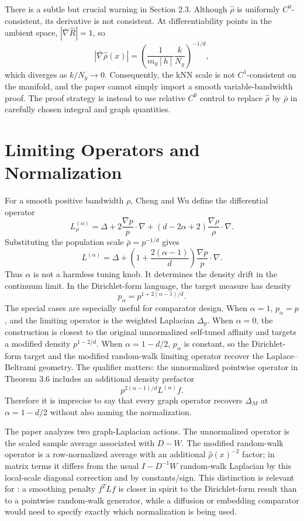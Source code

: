 \documentclass[11pt]{article}
\begin{document}
There is a subtle but crucial warning in Section 2.3. Although
\(\widehat\rho\) is uniformly \(C^0\)-consistent, its derivative is not
consistent. At differentiability points in the ambient space,
\(|\bar\nabla \widehat R|=1\), so
\[
  |\bar\nabla \widehat\rho(x)|
  =
  \left(\frac{1}{m_0[h]}\frac{k}{N_y}\right)^{-1/d},
\]
which diverges as \(k/N_y\to 0\). Consequently, the kNN scale is not
\(C^1\)-consistent on the manifold, and the paper cannot simply import a
smooth variable-bandwidth proof. The proof strategy is instead to use relative
\(C^0\) control to replace \(\widehat\rho\) by \(\bar\rho\) in carefully chosen
integral and graph quantities.

\section{Limiting Operators and Normalization}

For a smooth positive bandwidth \(\rho\), Cheng and Wu define the differential
operator
\[
  L_\rho^{(\alpha)}
  =
  \Delta
  +2\frac{\nabla p}{p}\cdot\nabla
  +(d-2\alpha+2)\frac{\nabla\rho}{\rho}\cdot\nabla .
\]
Substituting the population scale \(\bar\rho=p^{-1/d}\) gives
\[
  L^{(\alpha)}
  =
  \Delta
  +
  \left(1+\frac{2(\alpha-1)}{d}\right)
  \frac{\nabla p}{p}\cdot\nabla .
\]
Thus \(\alpha\) is not a harmless tuning knob. It determines the density drift
in the continuum limit. In the Dirichlet-form language, the target measure has
density
\[
  p_\alpha=p^{1+2(\alpha-1)/d}.
\]
The special cases are especially useful for comparator design. When
\(\alpha=1\), \(p_\alpha=p\), and the limiting operator is the weighted
Laplacian \(\Delta_p\). When \(\alpha=0\), the construction is closest to the
original unnormalized self-tuned affinity and targets a modified density
\(p^{1-2/d}\). When \(\alpha=1-d/2\), \(p_\alpha\) is constant, so the
Dirichlet-form target and the modified random-walk limiting operator recover
the Laplace--Beltrami geometry. The qualifier matters: the unnormalized
pointwise operator in Theorem 3.6 includes an additional density prefactor
\[
  p^{2(\alpha-1)/d}L^{(\alpha)}f.
\]
Therefore it is imprecise to say that every graph operator recovers
\(\Delta_M\) at \(\alpha=1-d/2\) without also naming the normalization.

The paper analyzes two graph-Laplacian actions. The unnormalized operator is
the scaled sample average associated with \(D-W\). The modified random-walk
operator is a row-normalized average with an additional
\(\widehat\rho(x)^{-2}\) factor; in matrix terms it differs from the usual
\(I-D^{-1}W\) random-walk Laplacian by this local-scale diagonal correction
and by constants/sign. This distinction is relevant for : a
smoothing penalty \(f^T L f\) is closer in spirit to the Dirichlet-form result
than to a pointwise random-walk generator, while a diffusion or embedding
comparator would need to specify exactly which normalization is being used.
\end{document}
